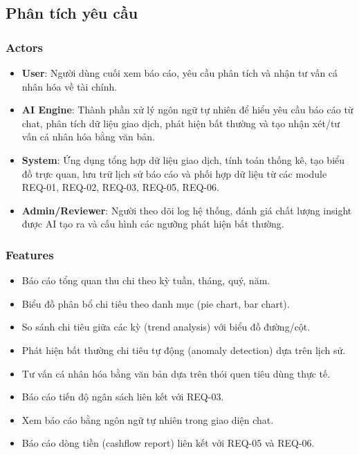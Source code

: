 \subsection{Phân tích yêu cầu}



\subsubsection{Actors}

\begin{itemize}
\item \textbf{User}: Người dùng cuối xem báo cáo, yêu cầu phân tích và nhận tư vấn cá nhân hóa về tài chính.
\item \textbf{AI Engine}: Thành phần xử lý ngôn ngữ tự nhiên để hiểu yêu cầu báo cáo từ chat, phân tích dữ liệu giao dịch, phát hiện bất thường và tạo nhận xét/tư vấn cá nhân hóa bằng văn bản.
\item \textbf{System}: Ứng dụng tổng hợp dữ liệu giao dịch, tính toán thống kê, tạo biểu đồ trực quan, lưu trữ lịch sử báo cáo và phối hợp dữ liệu từ các module REQ-01, REQ-02, REQ-03, REQ-05, REQ-06.
\item \textbf{Admin/Reviewer}: Người theo dõi log hệ thống, đánh giá chất lượng insight được AI tạo ra và cấu hình các ngưỡng phát hiện bất thường.
\end{itemize}
\subsubsection{Features}

\begin{itemize}
\item Báo cáo tổng quan thu chi theo kỳ tuần, tháng, quý, năm.
\item Biểu đồ phân bổ chi tiêu theo danh mục (pie chart, bar chart).
\item So sánh chi tiêu giữa các kỳ (trend analysis) với biểu đồ đường/cột.
\item Phát hiện bất thường chi tiêu tự động (anomaly detection) dựa trên lịch sử.
\item Tư vấn cá nhân hóa bằng văn bản dựa trên thói quen tiêu dùng thực tế.
\item Báo cáo tiến độ ngân sách liên kết với REQ-03.
\item Xem báo cáo bằng ngôn ngữ tự nhiên trong giao diện chat.
\item Báo cáo dòng tiền (cashflow report) liên kết với REQ-05 và REQ-06.
\end{itemize}
